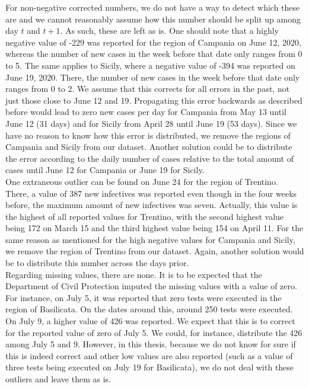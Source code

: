 \documentclass[12pt]{article}
\begin{document}
	For non-negative corrected numbers, we do not have a way to detect which these are and we cannot reasonably assume how this number should be split up among day $t$ and $t+1$. As such, these are left as is. One should note that a highly negative value of -229 was reported for the region of Campania on June 12, 2020, whereas the number of new cases in the week before that date only ranges from 0 to 5. The same applies to Sicily, where a negative value of -394 was reported on June 19, 2020. There, the number of new cases in the week before that date only ranges from 0 to 2. We assume that this corrects for all errors in the past, not just those close to June 12 and 19. Propagating this error backwards as described before would lead to zero new cases per day for Campania from May 13 until June 12 (31 days) and for Sicily from April 28 until June 19 (53 days). Since we have no reason to know how this error is distributed, we remove the regions of Campania and Sicily from our dataset. Another solution could be to distribute the error according to the daily number of cases relative to the total amount of cases until June 12 for Campania or June 19 for Sicily. \\
	
	One extraneous outlier can be found on June 24 for the region of Trentino. There, a value of 387 new infectives was reported even though in the four weeks before, the maximum amount of new infectives was seven. Actually, this value is the highest of all reported values for Trentino, with the second highest value being 172 on March 15 and the third highest value being 154 on April 11. For the same reason as mentioned for the high negative values for Campania and Sicily, we remove the region of Trentino from our dataset. Again, another solution would be to distribute this number across the days prior. \\
	
	Regarding missing values, there are none. It is to be expected that the Department of Civil Protection imputed the missing values with a value of zero. For instance, on July 5, it was reported that zero tests were executed in the region of Basilicata. On the dates around this, around 250 tests were executed. On July 9, a higher value of 426 was reported. We expect that this is to correct for the reported value of zero of July 5. We could, for instance, distribute the 426 among July 5 and 9. However, in this thesis, because we do not know for sure if this is indeed correct and other low values are also reported (such as a value of three tests being executed on July 19 for Basilicata), we do not deal with these outliers and leave them as is.
	
\end{document}

